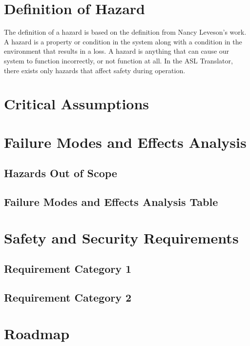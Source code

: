 \documentclass{article}
\begin{document}
\section{Definition of Hazard}

The definition of a hazard is based on the definition from Nancy Leveson’s work. A hazard is a property or condition in the system along with a condition in the
environment that results in a loss. A hazard is anything that can cause our system to function incorrectly, or not function at all. In the ASL Translator, there
exists only hazards that affect safety during operation.\\


\section{Critical Assumptions}

\section{Failure Modes and Effects Analysis}

\subsection{Hazards Out of Scope}

\subsection{Failure Modes and Effects Analysis Table}

\section{Safety and Security Requirements}
\subsection{Requirement Category 1}
\subsection{Requirement Category 2}

\section{Roadmap}
\end{document}
